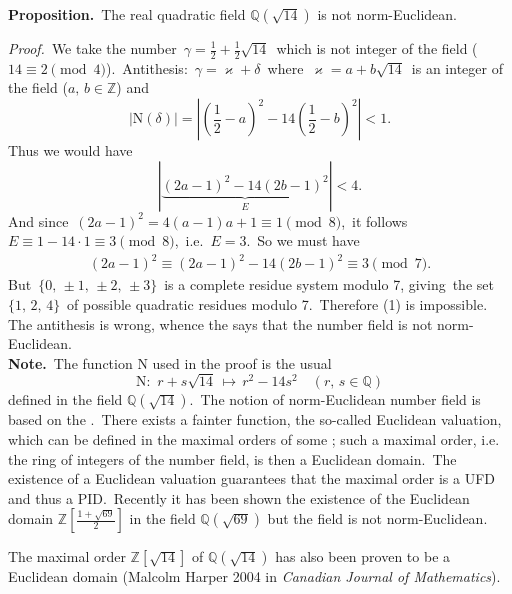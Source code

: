\documentclass[12pt]{article}
\theoremstyle{definition}
\begin{document}
\textbf{Proposition.}\, The real quadratic field $\mathbb{Q}(\sqrt{14})$ is not norm-Euclidean.

{\em Proof.}\, We take the number\, $\gamma = \frac{1}{2}+\frac{1}{2}\sqrt{14}$\, which is not integer of the field ($14 \equiv 2 \pmod{4}$).\, Antithesis:\, $\gamma = \varkappa+\delta$\, where\, $\varkappa = a+b\sqrt{14}$\, is an integer of the field ($a,\,b\in\mathbb{Z}$) and
$$|\mbox{N}(\delta)| = \left|\left(\frac{1}{2}-a\right)^2-14\left(\frac{1}{2}-b\right)^2\right| < 1.$$
Thus we would have
$$|\underbrace{(2a-1)^2-14(2b-1)^2}_{E}| < 4.$$
And since\, $(2a-1)^2 = 4(a-1)a+1 \equiv 1 \pmod{8}$,\, it follows\, $E \equiv 1-14\cdot1 \equiv 3 \pmod{8}$,\, i.e.\, $E = 3$.\, So we must have
\begin{align}
(2a-1)^2 \equiv (2a-1)^2-14(2b-1)^2 \equiv 3 \pmod{7}.
\end{align}
But\, $\{0,\,\pm1,\,\pm2,\,\pm3\}$\, is a complete residue system modulo 7, giving\, the set\, $\{1,\,2,\,4\}$\, of possible quadratic residues modulo 7.\, Therefore (1) is impossible.\, The antithesis is wrong, whence the  says that the number field is not norm-Euclidean.\\

\textbf{Note.}\, The function N used in the proof is the usual 
$$\mbox{N}:\,\, r\!+\!s\sqrt{14}\, \mapsto\, r^2\!-\!14s^2 \quad(r,\,s \in \mathbb{Q})$$
defined in the field $\mathbb{Q}(\sqrt{14})$.\, The notion of norm-Euclidean number field is based on the .\, There exists a fainter function, the so-called Euclidean valuation, which can be defined in the maximal orders of some ; such a maximal order, i.e. the ring of integers of the number field, is then a Euclidean domain.\, The existence of a Euclidean valuation guarantees that the maximal order is a UFD and thus a PID.\, Recently it has been shown the existence of the Euclidean domain $\mathbb{Z}[\frac{1+\sqrt{69}}{2}]$ in the field $\mathbb{Q}(\sqrt{69})$ but the field is not norm-Euclidean. 

The maximal order $\mathbb{Z}[\sqrt{14}]$ of $\mathbb{Q}(\sqrt{14})$ has also been proven to be a Euclidean domain (Malcolm Harper 2004 in {\em Canadian Journal of Mathematics}).
\end{document}
